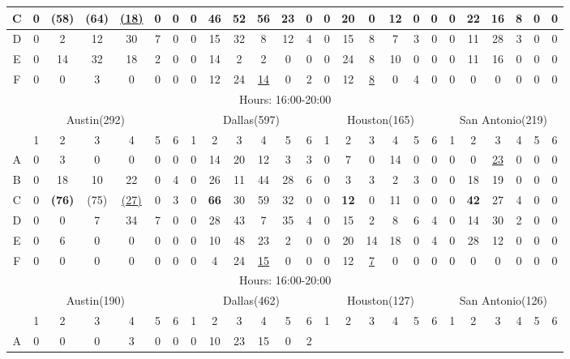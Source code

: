 \begin{table*}
\begin{tabular}{|c|c|c|c|c|c|c|c|c|c|c|c|c|c|c|c|c|c|c|c|c|c|c|c|c|}
\hline
C
& 0& \textbf{(58)}& (64)& \underline{(18)}& 0& 0
& 0& \textbf{46}& 52& 56& 23& 0 
& 0& \textbf{20}& 0& 12& 0& 0 
& 0& \textbf{22}& 16& 8& 0& 0 \\
\hline
D
& 0& 2& 12& 30& 7& 0 
& 0& 15& 32& 8& 12& 4
& 0& 15& 8& 7& 3& 0
& 0& 11& 28& 3& 0& 0 \\
\hline
E
& 0& 14& 32& 18& 2& 0 
& 0& 14& 2& 2& 0& 0 
& 0& 24& 8& 10& 0& 0 
& 0& 11& 16& 0& 0& 0 \\
\hline
F
& 0& 0& 3& 0& 0& 0
& 0& 12& 24& \underline{14}& 0& 2
& 0& 12& \underline{8}& 0& 4& 0 
& 0& 0& 0& 0& 0& 0 \\
\hline
\hline	
\multicolumn{25}{|c|}{Hours: 16:00-20:00} 	\\
\hline	
\multicolumn{7}{|c|}{Austin(292)} 	&
\multicolumn{6}{c|}{Dallas(597)} 	&
\multicolumn{6}{c|}{Houston(165)} 	&
\multicolumn{6}{c|}{San Antonio(219)} 	\\
\hline	
\hline	
 & 1 &2 & 3 & 4 & 5&6 	
 & 1 &2 & 3 & 4 & 5&6 	
 & 1 &2 & 3 & 4 & 5&6 	
 & 1 &2 & 3 & 4 & 5&6 \\	
\hline
A
& 0& 3& 0& 0& 0& 0
& 0& 14& 20& 12& 3& 3 
& 0& 7& 0& 14& 0& 0 
& 0& 0& \underline{23}& 0& 0& 0 \\
\hline
B
& 0& 18& 10& 22& 0& 4
& 0& 26& 11& 44& 28& 6
& 0& 3& 3& 2& 3& 0
& 0& 18& 19& 0& 0& 0 \\
\hline
C
& 0& \textbf{(76)}& (75)& \underline{(27)}& 0& 3
& 0& \textbf{66}& 30& 59& 32& 0
& 0& \textbf{12}& 0& 11& 0& 0
& 0& \textbf{42}& 27& 4& 0& 0 \\
\hline
D
& 0& 0& 7& 34& 7& 0
& 0& 28& 43& 7& 35& 4
& 0& 15& 2& 8& 6& 4
& 0& 14& 30& 2& 0& 0  \\
\hline
E
& 0& 6& 0& 0& 0& 0
& 0& 10& 48& 23& 2& 0 
& 0& 20& 14& 18& 0& 4 
& 0& 28& 12& 0& 0& 0 \\
\hline
F
& 0& 0& 0& 0& 0& 0 
& 0& 4& 24& \underline{15}& 0& 0 
& 0& 12& \underline{7}& 0& 0& 0
& 0& 0& 0& 0& 0& 0 \\
\hline
\hline	
\multicolumn{25}{|c|}{Hours: 16:00-20:00} 	\\
\hline	
\multicolumn{7}{|c|}{Austin(190)} 	&
\multicolumn{6}{c|}{Dallas(462)} 	&
\multicolumn{6}{c|}{Houston(127)} 	&
\multicolumn{6}{c|}{San Antonio(126)} 	\\
\hline	
\hline	
 & 1 &2 & 3 & 4 & 5&6 	
 & 1 &2 & 3 & 4 & 5&6 	
 & 1 &2 & 3 & 4 & 5&6 	
 & 1 &2 & 3 & 4 & 5&6 \\	
\hline
A
& 0& 0& 0& 3& 0& 0
& 0& 10& 23& 15& 0& 2

\end{tabular}
\end{table*}
